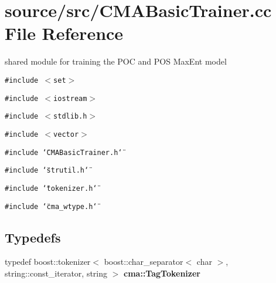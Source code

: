 \section{source/src/CMABasicTrainer.cc File Reference}
\label{CMABasicTrainer_8cc}
shared module for training the POC and POS MaxEnt model  


{\tt \#include $<$set$>$}\par
{\tt \#include $<$iostream$>$}\par
{\tt \#include $<$stdlib.h$>$}\par
{\tt \#include $<$vector$>$}\par
{\tt \#include \char`\"{}CMABasicTrainer.h\char`\"{}}\par
{\tt \#include \char`\"{}strutil.h\char`\"{}}\par
{\tt \#include \char`\"{}tokenizer.h\char`\"{}}\par
{\tt \#include \char`\"{}cma\_\-wtype.h\char`\"{}}\par
\subsection*{Typedefs}
\begin{CompactItemize}
\item 
typedef boost::tokenizer$<$ boost::char\_\-separator$<$ char $>$, string::const\_\-iterator, string $>$ \textbf{cma::TagTokenizer}\label{namespacecma_a0c6c2dc82197fc6600c20a59cade565}

\end{CompactItemize}
